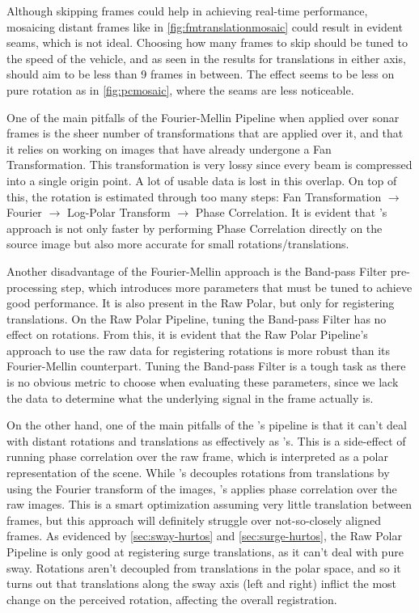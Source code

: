 Although skipping frames could help in achieving real-time performance, mosaicing distant frames like in \autoref{fig:fmtranslationmosaic} could result in evident seams, which is not ideal. Choosing how many frames to skip should be tuned to the speed of the vehicle, and as seen in the results for translations in either axis, should aim to be less than 9 frames in between. The effect seems to be less on pure rotation as in \autoref{fig:pcmosaic}, where the seams are less noticeable. 

One of the main pitfalls of the Fourier-Mellin Pipeline when applied over sonar frames is the sheer number of transformations that are applied over it, and that it relies on working on images that have already undergone a Fan Transformation. This transformation is very lossy since every beam is compressed into a single origin point. A lot of usable data is lost in this overlap. On top of this, the rotation is estimated through too many steps: Fan Transformation $\rightarrow$ Fourier $\rightarrow$ Log-Polar Transform $\rightarrow$ Phase Correlation. It is evident that \citeauthor{Hurtos2015}'s approach is not only faster by performing Phase Correlation directly on the source image but also more accurate for small rotations/translations. 

Another disadvantage of the Fourier-Mellin approach is the Band-pass Filter pre-processing step, which introduces more parameters that must be tuned to achieve good performance. It is also present in the Raw Polar, but only for registering translations. On the Raw Polar Pipeline, tuning the Band-pass Filter has no effect on rotations. From this, it is evident that the Raw Polar Pipeline's approach to use the raw data for registering rotations is more robust than its Fourier-Mellin counterpart. Tuning the Band-pass Filter is a tough task as there is no obvious metric to choose when evaluating these parameters, since we lack the data to determine what the underlying signal in the frame actually is. 

On the other hand, one of the main pitfalls of the \citeauthor{Hurtos2015}'s pipeline is that it can't deal with distant rotations and translations as effectively as \citeauthor{Reddy1996}'s. This is a side-effect of running phase correlation over the raw frame, which is interpreted as a polar representation of the scene. While \citeauthor{Reddy1996}'s decouples rotations from translations by using the Fourier transform of the images, \citeauthor{Hurtos2015}'s applies phase correlation over the raw images. This is a smart optimization assuming very little translation between frames, but this approach will definitely struggle over not-so-closely aligned frames. As evidenced by \autoref{sec:sway-hurtos} and \autoref{sec:surge-hurtos}, the Raw Polar Pipeline is only good at registering surge translations, as it can't deal with pure sway. Rotations aren't decoupled from translations in the polar space, and so it turns out that translations along the sway axis (left and right) inflict the most change on the perceived rotation, affecting the overall registration. 

